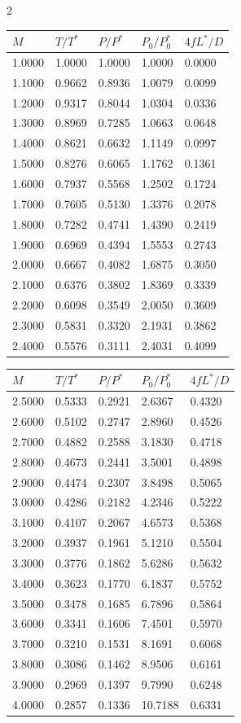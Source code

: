  
 \begin{multicols}{2}
 \begin{tabular}{|l|l|l|l|l|}
 \hline
 $M$ & $T/T^*$ & $P/P^*$ & $P_0/P_0^*$ & $4fL^*/D$ \\\hline
1.0000&1.0000&1.0000& 1.0000&0.0000\\\hline
1.1000&0.9662&0.8936& 1.0079&0.0099\\\hline
1.2000&0.9317&0.8044& 1.0304&0.0336\\\hline
1.3000&0.8969&0.7285& 1.0663&0.0648\\\hline
1.4000&0.8621&0.6632& 1.1149&0.0997\\\hline
1.5000&0.8276&0.6065& 1.1762&0.1361\\\hline
1.6000&0.7937&0.5568& 1.2502&0.1724\\\hline
1.7000&0.7605&0.5130& 1.3376&0.2078\\\hline
1.8000&0.7282&0.4741& 1.4390&0.2419\\\hline
1.9000&0.6969&0.4394& 1.5553&0.2743\\\hline
2.0000&0.6667&0.4082& 1.6875&0.3050\\\hline
2.1000&0.6376&0.3802& 1.8369&0.3339\\\hline
2.2000&0.6098&0.3549& 2.0050&0.3609\\\hline
2.3000&0.5831&0.3320& 2.1931&0.3862\\\hline
2.4000&0.5576&0.3111& 2.4031&0.4099\\\hline
 \end{tabular}
 \begin{tabular}{|l|l|l|l|l|}
 \hline
 $M$ & $T/T^*$ & $P/P^*$ & $P_0/P_0^*$ & $4fL^*/D$ \\\hline
2.5000&0.5333&0.2921& 2.6367&0.4320\\\hline
2.6000&0.5102&0.2747& 2.8960&0.4526\\\hline
2.7000&0.4882&0.2588& 3.1830&0.4718\\\hline
2.8000&0.4673&0.2441& 3.5001&0.4898\\\hline
2.9000&0.4474&0.2307& 3.8498&0.5065\\\hline
3.0000&0.4286&0.2182& 4.2346&0.5222\\\hline
3.1000&0.4107&0.2067& 4.6573&0.5368\\\hline
3.2000&0.3937&0.1961& 5.1210&0.5504\\\hline
3.3000&0.3776&0.1862& 5.6286&0.5632\\\hline
3.4000&0.3623&0.1770& 6.1837&0.5752\\\hline
3.5000&0.3478&0.1685& 6.7896&0.5864\\\hline
3.6000&0.3341&0.1606& 7.4501&0.5970\\\hline
3.7000&0.3210&0.1531& 8.1691&0.6068\\\hline
3.8000&0.3086&0.1462& 8.9506&0.6161\\\hline
3.9000&0.2969&0.1397& 9.7990&0.6248\\\hline
4.0000&0.2857&0.1336&10.7188&0.6331\\\hline
 \end{tabular}
 \end{multicols}
 

